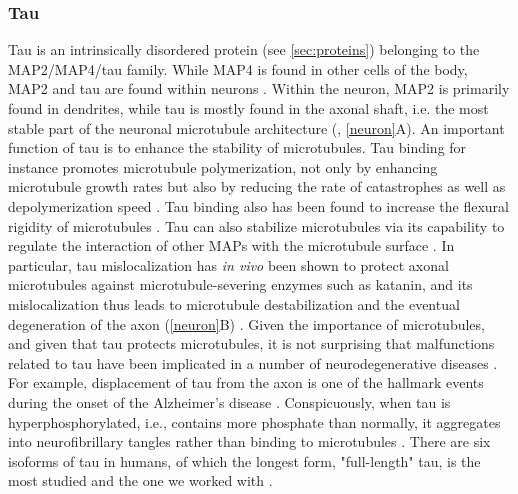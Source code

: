 \subsubsection{Tau}
\label{sec:tau_intro}
Tau is an intrinsically disordered protein (see \autoref{sec:proteins}) belonging to the MAP2/MAP4/tau family. While MAP4 is found in other cells of the body, MAP2 and tau are found within neurons . Within the neuron, MAP2 is primarily found in dendrites, while tau is mostly found in the axonal shaft, i.e. the most stable part of the neuronal microtubule architecture (\cite{Dehmelt2005}, \autoref{neuron}A). An important function of tau is to enhance the stability of microtubules. Tau binding for instance promotes microtubule polymerization, not only by enhancing microtubule growth rates but also by reducing the rate of catastrophes as well as depolymerization speed \parencite{Drechsel1992}. Tau binding also has been found to increase the flexural rigidity of microtubules . Tau can also stabilize microtubules via its capability to regulate the interaction of other MAPs with the microtubule surface \parencite{Morris2011b}. In particular, tau mislocalization has \textit{in vivo} been shown to protect axonal microtubules against microtubule-severing enzymes such as katanin, and its mislocalization thus leads to microtubule destabilization and the eventual degeneration of the axon (\autoref{neuron}B) \parencite{Qiang2006}. Given the importance of microtubules, and given that tau protects microtubules, it is not surprising that malfunctions related to tau have been implicated in a number of neurodegenerative diseases \parencite{Gao2018,Morris2011b,iqbal2016tau}. For example, displacement of tau from the axon is one of the hallmark events during the onset of the Alzheimer’s disease \parencite{zempel2015tau}. Conspicuously, when tau is hyperphosphorylated, i.e., contains more phosphate than normally, it aggregates into neurofibrillary tangles rather than binding to microtubules . There are six isoforms of tau in humans, of which the longest form, "full-length" tau, is the most studied and the one we worked with .\par

